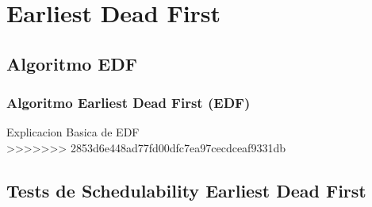 \documentclass[xcolor=table]{beamer}
\begin{document}

\section{Earliest Dead First}

\subsection{Algoritmo EDF}

\begin{frame} 
\frametitle{Algoritmo Earliest Dead First (EDF)} 
Explicacion Basica de EDF \\
>>>>>>> 2853d6e448ad77fd00dfc7ea97cecdceaf9331db
\end{frame}

\subsection{Tests de Schedulability  Earliest Dead First } 
\end{document}
